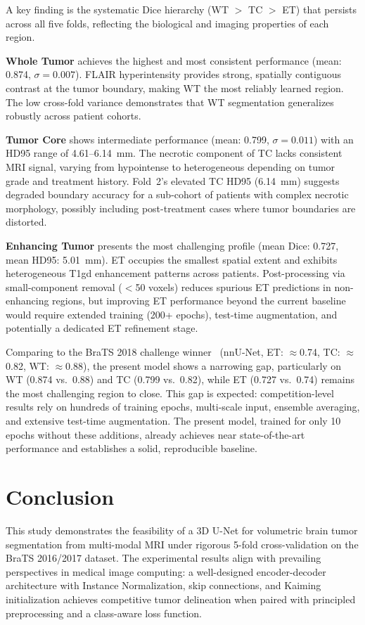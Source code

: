 \documentclass[10pt,twocolumn]{article}
\begin{document}
A key finding is the systematic Dice hierarchy (WT $>$ TC $>$
ET) that persists across all five folds, reflecting the
biological and imaging properties of each region.

\textbf{Whole Tumor} achieves the highest and most consistent
performance (mean: 0.874, $\sigma = 0.007$). FLAIR
hyperintensity provides strong, spatially contiguous contrast at
the tumor boundary, making WT the most reliably learned region.
The low cross-fold variance demonstrates that WT segmentation
generalizes robustly across patient cohorts.

\textbf{Tumor Core} shows intermediate performance (mean: 0.799,
$\sigma = 0.011$) with an HD95 range of 4.61--6.14~mm.
The necrotic component of TC lacks consistent MRI signal, varying
from hypointense to heterogeneous depending on tumor grade and
treatment history. Fold~2's elevated TC HD95 (6.14~mm) suggests
degraded boundary accuracy for a sub-cohort of patients with
complex necrotic morphology, possibly including post-treatment
cases where tumor boundaries are distorted.

\textbf{Enhancing Tumor} presents the most challenging profile
(mean Dice: 0.727, mean HD95: 5.01~mm). ET occupies the smallest
spatial extent and exhibits heterogeneous T1gd enhancement
patterns across patients. Post-processing via small-component
removal ($<$50 voxels) reduces spurious ET predictions in non-
enhancing regions, but improving ET performance beyond the
current baseline would require extended training (200+ epochs),
test-time augmentation, and potentially a dedicated ET
refinement stage.

Comparing to the BraTS 2018 challenge
winner~\cite{isensee2021} (nnU-Net, ET: $\approx$0.74, TC:
$\approx$0.82, WT: $\approx$0.88), the present model shows a narrowing gap, particularly on WT
(0.874 vs.\ 0.88) and TC (0.799 vs.\ 0.82), while ET (0.727
vs.\ 0.74) remains the most challenging region to close. This gap is expected: competition-level
results rely on hundreds of training epochs, multi-scale input,
ensemble averaging, and extensive test-time augmentation. The
present model, trained for only 10 epochs without these
additions, already achieves near state-of-the-art performance
and establishes a solid, reproducible baseline.

\section{Conclusion}

This study demonstrates the feasibility of a 3D U-Net for
volumetric brain tumor segmentation from multi-modal MRI under
rigorous 5-fold cross-validation on the BraTS 2016/2017 dataset.
The experimental results align with prevailing perspectives in
medical image computing: a well-designed encoder-decoder
architecture with Instance Normalization, skip connections, and
Kaiming initialization achieves competitive tumor delineation
when paired with principled preprocessing and a class-aware loss
function.
\end{document}
